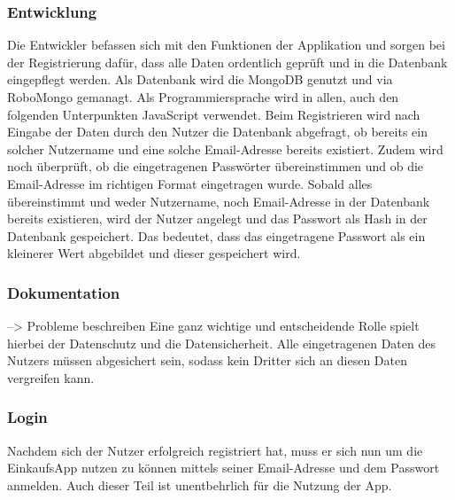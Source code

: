 \documentclass[12pt,a4paper]{article}
\begin{document}
\subsubsection*{Entwicklung}
Die Entwickler befassen sich mit den Funktionen der Applikation  und sorgen bei der Registrierung dafür, dass alle Daten ordentlich geprüft  und in die Datenbank eingepflegt werden.
Als Datenbank wird die MongoDB genutzt und via RoboMongo gemanagt. Als Programmiersprache wird in allen, auch den folgenden Unterpunkten JavaScript verwendet.
Beim Registrieren wird nach Eingabe der Daten durch den Nutzer die Datenbank abgefragt, ob bereits ein solcher Nutzername und eine solche Email-Adresse bereits existiert.
Zudem wird noch überprüft, ob die eingetragenen Passwörter übereinstimmen und ob die Email-Adresse im richtigen Format eingetragen wurde. 
Sobald alles übereinstimmt und weder Nutzername, noch Email-Adresse in der Datenbank bereits existieren, wird der Nutzer angelegt und das Passwort als Hash in der Datenbank gespeichert. 
Das bedeutet, dass das eingetragene Passwort als ein kleinerer Wert abgebildet und dieser gespeichert wird.
\subsubsection*{Dokumentation} --> Probleme beschreiben
Eine ganz wichtige und entscheidende Rolle spielt hierbei der Datenschutz und die Datensicherheit. Alle eingetragenen Daten des Nutzers müssen abgesichert sein, sodass kein Dritter sich an diesen Daten vergreifen kann.
\newpage
\subsubsection{Login}
Nachdem sich der Nutzer erfolgreich registriert hat, muss er sich nun um die EinkaufsApp nutzen zu können mittels seiner Email-Adresse und dem Passwort anmelden.
Auch dieser Teil ist unentbehrlich für die Nutzung der App. 
\end{document}
